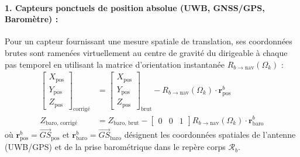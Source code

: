 \documentclass[../Formulations_Kalman.tex]{subfiles}
\begin{document}
\paragraph{1. Capteurs ponctuels de position absolue (UWB, GNSS/GPS, Baromètre) :}
Pour un capteur fournissant une mesure spatiale de translation, ses coordonnées brutes sont ramenées virtuellement au centre de gravité du dirigeable à chaque pas temporel en utilisant la matrice d'orientation instantanée $R_{b \to \text{nav}}(\Omega_k)$ :
\begin{align}
\begin{bmatrix} X_{\text{pos}} \\ Y_{\text{pos}} \\ Z_{\text{pos}} \end{bmatrix}_{\text{corrigé}} &= \begin{bmatrix} X_{\text{pos}} \\ Y_{\text{pos}} \\ Z_{\text{pos}} \end{bmatrix}_{\text{brut}} - R_{b \to \text{nav}}(\Omega_k) \cdot \mathbf{r}_{\text{pos}}^b \\
Z_{\text{baro, corrigé}} &= Z_{\text{baro, brut}} - \begin{bmatrix} 0 & 0 & 1 \end{bmatrix} R_{b \to \text{nav}}(\Omega_k) \cdot \mathbf{r}_{\text{baro}}^b
\end{align}
où $\mathbf{r}_{\text{pos}}^b = \vec{GS}_{\text{pos}}$ et $\mathbf{r}_{\text{baro}}^b = \vec{GS}_{\text{baro}}$ désignent les coordonnées spatiales de l'antenne (UWB/GPS) et de la prise barométrique dans le repère corps $\mathcal{R}_b$.
\end{document}
